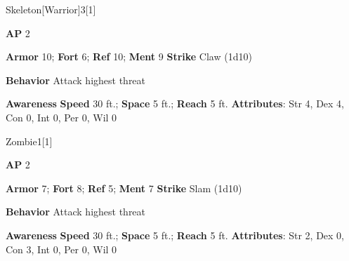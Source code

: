 \begin{monsection}{Skeleton}[Warrior]{3}[1]
\vspace{-1em}\vspace{-1em}
\begin{spellcontent}
\begin{spelltargetinginfo}
{\textbf{AP} 2}

\pari \textbf{Armor} 10;
\textbf{Fort} 6;
\textbf{Ref} 10;
\textbf{Ment} 9
\pari \textbf{Strike} Claw  (1d10)



\pari \textbf{Behavior} Attack highest threat
\end{spelltargetinginfo}
\end{spellcontent}

\begin{monsterfooter}
\pari \textbf{Awareness} 
\pari \textbf{Speed} 30 ft.;
\textbf{Space} 5 ft.;
\textbf{Reach} 5 ft.
\pari \textbf{Attributes}:
Str 4,
Dex 4,
Con 0,
Int 0,
Per 0,
Wil 0
\end{monsterfooter}
\end{monsection}

\begin{monsection}{Zombie}{1}[1]
\vspace{-1em}\vspace{-1em}
\begin{spellcontent}
\begin{spelltargetinginfo}
{\textbf{AP} 2}

\pari \textbf{Armor} 7;
\textbf{Fort} 8;
\textbf{Ref} 5;
\textbf{Ment} 7
\pari \textbf{Strike} Slam  (1d10)



\pari \textbf{Behavior} Attack highest threat
\end{spelltargetinginfo}
\end{spellcontent}

\begin{monsterfooter}
\pari \textbf{Awareness} 
\pari \textbf{Speed} 30 ft.;
\textbf{Space} 5 ft.;
\textbf{Reach} 5 ft.
\pari \textbf{Attributes}:
Str 2,
Dex 0,
Con 3,
Int 0,
Per 0,
Wil 0
\end{monsterfooter}
\end{monsection}
